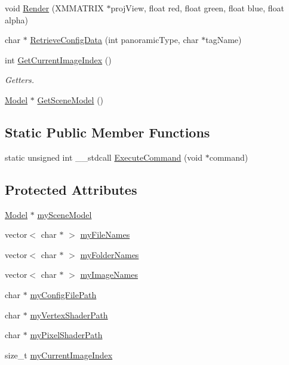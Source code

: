 \begin{DoxyCompactItemize}
void \hyperlink{class_scene_ae8e1162a6435f77bbe81715c2fe76962}{Render} (X\+M\+M\+A\+T\+R\+IX $\ast$proj\+View, float red, float green, float blue, float alpha)
\item 
char $\ast$ \hyperlink{class_scene_a7c7f4f0d11651cb5f9fcb9ce69971707}{Retrieve\+Config\+Data} (int panoramic\+Type, char $\ast$tag\+Name)
\item 
int \hyperlink{class_scene_a934acc3f9bc85a2a236f92203c1f8481}{Get\+Current\+Image\+Index} ()
\begin{DoxyCompactList}\small\item\em Getters. \end{DoxyCompactList}\item 
\hyperlink{class_model}{Model} $\ast$ \hyperlink{class_scene_a21e0ad605a5e7b62a2990c6b61b8cb64}{Get\+Scene\+Model} ()
\end{DoxyCompactItemize}
\subsection*{Static Public Member Functions}
\begin{DoxyCompactItemize}
\item 
static unsigned int \+\_\+\+\_\+stdcall \hyperlink{class_scene_aee04ba430169390a86bf0b90412a2ade}{Execute\+Command} (void $\ast$command)
\end{DoxyCompactItemize}
\subsection*{Protected Attributes}
\begin{DoxyCompactItemize}
\item 
\hyperlink{class_model}{Model} $\ast$ \hyperlink{class_scene_aee4ac4b42d77693f9ca0afc37171edb2}{my\+Scene\+Model}
\item 
vector$<$ char $\ast$ $>$ \hyperlink{class_scene_a632ef8efd7a07a1567c9b98113560259}{my\+File\+Names}
\item 
vector$<$ char $\ast$ $>$ \hyperlink{class_scene_afe6069fd8add9681a02f69dc83c21e2c}{my\+Folder\+Names}
\item 
vector$<$ char $\ast$ $>$ \hyperlink{class_scene_a37cfe0951a860c0fdff5fdc1f01eacc5}{my\+Image\+Names}
\item 
char $\ast$ \hyperlink{class_scene_a81d6f3523e23e6c9b74b6c8f8c5964d9}{my\+Config\+File\+Path}
\item 
char $\ast$ \hyperlink{class_scene_afca007585a1c32c674fa29dc0376f234}{my\+Vertex\+Shader\+Path}
\item 
char $\ast$ \hyperlink{class_scene_a733ea785e1da8455d1213172fff512a7}{my\+Pixel\+Shader\+Path}
\item 
size\+\_\+t \hyperlink{class_scene_a42e8eb55edbe8eb64a5395bb99ad17e3}{my\+Current\+Image\+Index}
\end{DoxyCompactItemize}


